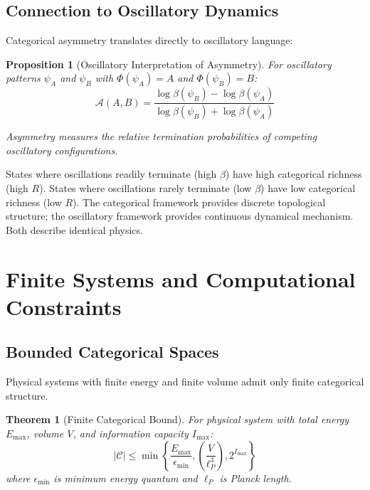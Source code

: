 \documentclass[12pt,a4paper]{article}
\newtheorem{theorem}{Theorem}
\newtheorem{proposition}{Proposition}
\begin{document}
\subsection{Connection to Oscillatory Dynamics}

Categorical asymmetry translates directly to oscillatory language:

\begin{proposition}[Oscillatory Interpretation of Asymmetry]
\label{prop:oscillatory_asymmetry}
For oscillatory patterns $\psi_A$ and $\psi_B$ with $\Phi(\psi_A) = A$ and $\Phi(\psi_B) = B$:
\begin{equation}
\mathcal{A}(A, B) = \frac{\log \beta(\psi_B) - \log \beta(\psi_A)}{\log \beta(\psi_B) + \log \beta(\psi_A)}
\end{equation}

Asymmetry measures the relative termination probabilities of competing oscillatory configurations.
\end{proposition}

States where oscillations readily terminate (high $\beta$) have high categorical richness (high $R$). States where oscillations rarely terminate (low $\beta$) have low categorical richness (low $R$). The categorical framework provides discrete topological structure; the oscillatory framework provides continuous dynamical mechanism. Both describe identical physics.

\section{Finite Systems and Computational Constraints}

\subsection{Bounded Categorical Spaces}

Physical systems with finite energy and finite volume admit only finite categorical structure.

\begin{theorem}[Finite Categorical Bound]
\label{thm:finite_categorical}
For physical system with total energy $E_{\text{max}}$, volume $V$, and information capacity $I_{\text{max}}$:
\begin{equation}
|\mathcal{C}| \leq \min\left\{ \frac{E_{\text{max}}}{\epsilon_{\text{min}}}, \left(\frac{V}{\ell_P^3}\right), 2^{I_{\text{max}}} \right\}
\end{equation}
where $\epsilon_{\text{min}}$ is minimum energy quantum and $\ell_P$ is Planck length.
\end{theorem}
\end{document}

